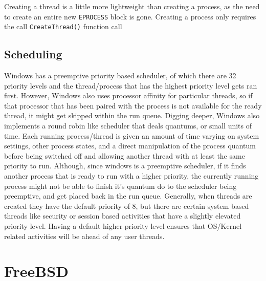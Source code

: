 \documentclass[10pt,conference,draftclsnofoot,onecolumn]{IEEEtran}
\begin{document}
    Creating a thread is a little more lightweight than creating a process, as the need to create an entire new \texttt{EPROCESS} block is gone. Creating a process only requires the call \texttt{CreateThread()} function call


\subsection{Scheduling}
    Windows has a preemptive priority based scheduler, of which there are 32 priority levels and the thread/process that has the highest priority level gets ran first. However, Windows also uses processor affinity for particular threads, so if that processor that has been paired with the process is not available for the ready thread, it might get skipped within the run queue. Digging deeper, Windows also implements a round robin like scheduler that deals quantums, or small units of time. Each running process/thread is given an amount of time varying on system settings, other process states, and a direct manipulation of the process quantum before being switched off and allowing another thread with at least the same priority to run\cite{1}. Although, since windows is a preemptive scheduler, if it finds another process that is ready to run with a higher priority, the currently running process might not be able to finish it’s quantum do to the scheduler being preemptive, and get placed back in the run queue\cite{1}.
    Generally, when threads are created they have the default priority of 8, but there are certain system based threads like security or session based activities that have a slightly elevated priority level. Having a default higher priority level ensures that OS/Kernel related activities will be ahead of any user threads. \newline \newline



\section{FreeBSD}
\end{document}

